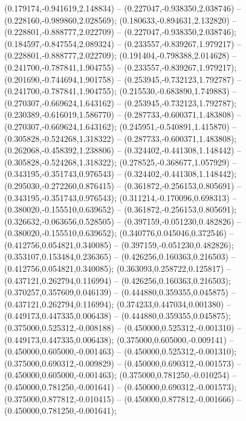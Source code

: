  (0.179174,-0.941619,2.148834) -- (0.227047,-0.938350,2.038746) -- (0.228160,-0.989860,2.028569);
 (0.180633,-0.894631,2.132820) -- (0.228801,-0.888777,2.022709) -- (0.227047,-0.938350,2.038746);
 (0.184597,-0.847554,2.089324) -- (0.233557,-0.839267,1.979217) -- (0.228801,-0.888777,2.022709);
 (0.191404,-0.798388,2.014628) -- (0.241700,-0.787841,1.904755) -- (0.233557,-0.839267,1.979217);
 (0.201690,-0.744694,1.901758) -- (0.253945,-0.732123,1.792787) -- (0.241700,-0.787841,1.904755);
 (0.215530,-0.683890,1.749883) -- (0.270307,-0.669624,1.643162) -- (0.253945,-0.732123,1.792787);
 (0.230389,-0.616019,1.586770) -- (0.287733,-0.600371,1.483808) -- (0.270307,-0.669624,1.643162);
 (0.245951,-0.540891,1.415870) -- (0.305828,-0.524268,1.318322) -- (0.287733,-0.600371,1.483808);
 (0.262068,-0.458392,1.238806) -- (0.324402,-0.441308,1.148442) -- (0.305828,-0.524268,1.318322);
 (0.278525,-0.368677,1.057929) -- (0.343195,-0.351743,0.976543) -- (0.324402,-0.441308,1.148442);
 (0.295030,-0.272260,0.876415) -- (0.361872,-0.256153,0.805691) -- (0.343195,-0.351743,0.976543);
 (0.311214,-0.170096,0.698313) -- (0.380020,-0.155510,0.639652) -- (0.361872,-0.256153,0.805691);
 (0.326632,-0.063656,0.528505) -- (0.397159,-0.051230,0.482826) -- (0.380020,-0.155510,0.639652);
 (0.340776,0.045046,0.372546) -- (0.412756,0.054821,0.340085) -- (0.397159,-0.051230,0.482826);
 (0.353107,0.153484,0.236365) -- (0.426256,0.160363,0.216503) -- (0.412756,0.054821,0.340085);
 (0.363093,0.258722,0.125817) -- (0.437121,0.262794,0.116994) -- (0.426256,0.160363,0.216503);
 (0.370257,0.357609,0.046139) -- (0.444880,0.359355,0.045875) -- (0.437121,0.262794,0.116994);
 (0.374233,0.447034,0.001380) -- (0.449173,0.447335,0.006438) -- (0.444880,0.359355,0.045875);
 (0.375000,0.525312,-0.008188) -- (0.450000,0.525312,-0.001310) -- (0.449173,0.447335,0.006438);
 (0.375000,0.605000,-0.009141) -- (0.450000,0.605000,-0.001463) -- (0.450000,0.525312,-0.001310);
 (0.375000,0.690312,-0.009829) -- (0.450000,0.690312,-0.001573) -- (0.450000,0.605000,-0.001463);
 (0.375000,0.781250,-0.010254) -- (0.450000,0.781250,-0.001641) -- (0.450000,0.690312,-0.001573);
 (0.375000,0.877812,-0.010415) -- (0.450000,0.877812,-0.001666) -- (0.450000,0.781250,-0.001641);
